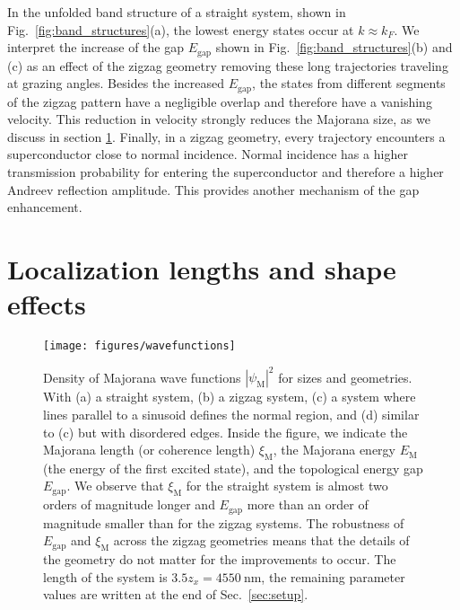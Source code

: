 \documentclass[english, twocolumn, 10pt, aps, superscriptaddress, floatfix, prb, citeautoscript]{revtex4-1}
\renewcommand{\comment}[2]{#2}
\begin{document}
\comment{Zigzag improves the gap and size because of cutting of trajectories and increasing transparency.}
In the unfolded band structure of a straight system, shown in Fig.~\ref{fig:band_structures}(a), the lowest energy states occur at $k \approx k_F$.
We interpret the increase of the gap $E_\textrm{gap}$ shown in Fig.~\ref{fig:band_structures}(b) and (c) as an effect of the zigzag geometry removing these long trajectories traveling at grazing angles.
Besides the increased $E_\textrm{gap}$, the states from different segments of the zigzag pattern have a negligible overlap and therefore have a vanishing velocity.
This reduction in velocity strongly reduces the Majorana size, as we discuss in section \ref{sec:shape_effects}.
Finally, in a zigzag geometry, every trajectory encounters a superconductor close to normal incidence.
Normal incidence has a higher transmission probability for entering the superconductor and therefore a higher Andreev reflection amplitude.
This provides another mechanism of the gap enhancement.


\section{Localization lengths and shape effects}\label{sec:shape_effects}

\begin{figure}[!htb]
\texttt{[image: figures/wavefunctions]}
\caption{Density of Majorana wave functions $\left| \psi_\textrm{M} \right|^2$ for sizes and geometries.
With (a) a straight system, (b) a zigzag system, (c) a system where lines parallel to a sinusoid defines the normal region, and (d) similar to (c) but with disordered edges.
Inside the figure, we indicate the Majorana length (or coherence length) $\xi_\textrm{M}$, the Majorana energy $E_\textrm{M}$ (the energy of the first excited state), and the topological energy gap $E_\textrm{gap}$.
We observe that $\xi_\textrm{M}$ for the straight system is almost two orders of magnitude longer and $E_\textrm{gap}$ more than an order of magnitude smaller than for the zigzag systems.
The robustness of $E_\textrm{gap}$ and $\xi_\textrm{M}$ across the zigzag geometries means that the details of the geometry do not matter for the improvements to occur.
The length of the system is $3.5 z_x=\SI{4550}{\nm}$, the remaining parameter values are written at the end of Sec.~\ref{sec:setup}.\label{fig:wave_functions}}
\end{figure}
\end{document}

